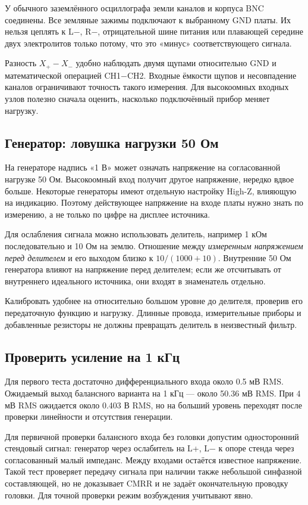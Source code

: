 \documentclass[a4paper,11pt]{article}
\begin{document}
У обычного заземлённого осциллографа земли каналов и корпуса BNC соединены.
Все земляные зажимы подключают к выбранному GND платы.
Их нельзя цеплять к L−, R−, отрицательной шине питания или плавающей середине
двух электролитов только потому, что это «минус» соответствующего сигнала.

Разность $X_+-X_-$ удобно наблюдать двумя щупами относительно GND и
математической операцией CH1−CH2. Входные ёмкости щупов и несовпадение каналов
ограничивают точность такого измерения. Для высокоомных входных узлов полезно
сначала оценить, насколько подключённый прибор меняет нагрузку.

\subsection{Генератор: ловушка нагрузки 50 Ом}

На генераторе надпись «1 В» может означать напряжение на согласованной нагрузке
50 Ом. Высокоомный вход получит другое напряжение, нередко вдвое больше.
Некоторые генераторы имеют отдельную настройку High-Z, влияющую на индикацию.
Поэтому действующее напряжение на входе платы нужно знать по измерению,
а не только по цифре на дисплее источника.

Для ослабления сигнала можно использовать делитель, например 1 кОм последовательно
и 10 Ом на землю. Отношение между \emph{измеренным напряжением перед делителем}
и его выходом близко к $10/(1000+10)$. Внутренние 50 Ом генератора влияют на
напряжение перед делителем; если же отсчитывать от внутреннего идеального
источника, они входят в знаменатель отдельно.

Калибровать удобнее на относительно большом уровне до делителя, проверив его
передаточную функцию и нагрузку. Длинные провода, измерительные приборы и
добавленные резисторы не должны превращать делитель в неизвестный фильтр.

\subsection{Проверить усиление на 1 кГц}

Для первого теста достаточно дифференциального входа около 0.5 мВ RMS.
Ожидаемый выход балансного варианта на 1 кГц — около 50.36 мВ RMS.
При 4 мВ RMS ожидается около 0.403 В RMS, но на больший уровень переходят
после проверки линейности и отсутствия генерации.

Для первичной проверки балансного входа без головки допустим односторонний
стендовый сигнал: генератор через ослабитель на L+, L− к опоре стенда через
согласованный малый импеданс. Между входами остаётся известное напряжение.
Такой тест проверяет передачу сигнала при наличии также небольшой синфазной
составляющей, но не доказывает CMRR и не задаёт окончательную проводку головки.
Для точной проверки режим возбуждения учитывают явно.
\end{document}
